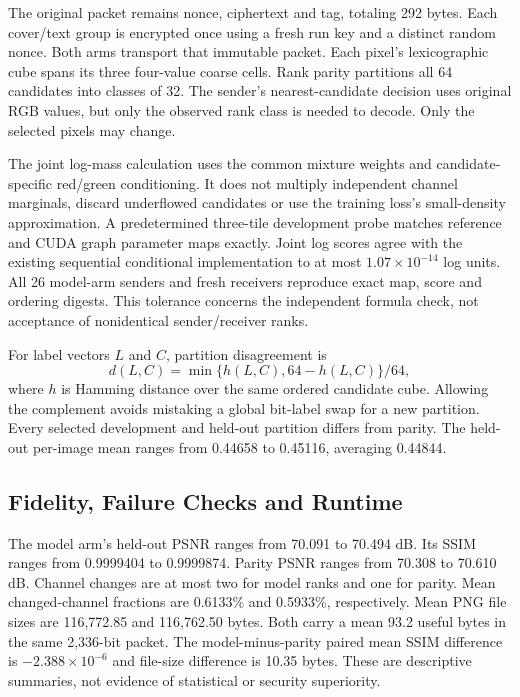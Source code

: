 The original packet remains nonce, ciphertext and tag, totaling 292 bytes. Each cover/text group is encrypted once using a fresh run key and a distinct random nonce. Both arms transport that immutable packet. Each pixel's lexicographic cube spans its three four-value coarse cells. Rank parity partitions all 64 candidates into classes of 32. The sender's nearest-candidate decision uses original RGB values, but only the observed rank class is needed to decode. Only the selected pixels may change.

The joint log-mass calculation uses the common mixture weights and candidate-specific red/green conditioning. It does not multiply independent channel marginals, discard underflowed candidates or use the training loss's small-density approximation. A predetermined three-tile development probe matches reference and CUDA graph parameter maps exactly. Joint log scores agree with the existing sequential conditional implementation to at most $1.07\times10^{-14}$ log units. All 26 model-arm senders and fresh receivers reproduce exact map, score and ordering digests. This tolerance concerns the independent formula check, not acceptance of nonidentical sender/receiver ranks.

For label vectors $L$ and $C$, partition disagreement is
\begin{equation}
d(L,C)=\min\{h(L,C),64-h(L,C)\}/64,
\end{equation}
where $h$ is Hamming distance over the same ordered candidate cube. Allowing the complement avoids mistaking a global bit-label swap for a new partition. Every selected development and held-out partition differs from parity. The held-out per-image mean ranges from 0.44658 to 0.45116, averaging 0.44844.

\subsection{Fidelity, Failure Checks and Runtime}
The model arm's held-out PSNR ranges from 70.091 to 70.494 dB. Its SSIM ranges from 0.9999404 to 0.9999874. Parity PSNR ranges from 70.308 to 70.610 dB. Channel changes are at most two for model ranks and one for parity. Mean changed-channel fractions are 0.6133\% and 0.5933\%, respectively. Mean PNG file sizes are 116,772.85 and 116,762.50 bytes. Both carry a mean 93.2 useful bytes in the same 2,336-bit packet. The model-minus-parity paired mean SSIM difference is $-2.388\times10^{-6}$ and file-size difference is 10.35 bytes. These are descriptive summaries, not evidence of statistical or security superiority.

